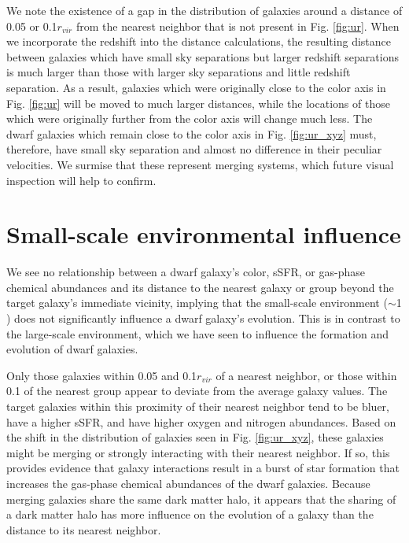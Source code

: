 We note the existence of a gap in the distribution of galaxies around a distance 
of 0.05 \hMpc or 0.1$r_{vir}$ from the nearest neighbor that is not present in 
Fig. \ref{fig:ur}.  When we incorporate the redshift into the distance 
calculations, the resulting distance between galaxies which have small sky 
separations but larger redshift separations is much larger than those with 
larger sky separations and little redshift separation.  As a result, galaxies 
which were originally close to the color axis in Fig. \ref{fig:ur} will be 
moved to much larger distances, while the locations of those which were 
originally further from the color axis will change much less.  The dwarf 
galaxies which remain close to the color axis in Fig. \ref{fig:ur_xyz} must, 
therefore, have small sky separation and almost no difference in their peculiar 
velocities.  We surmise that these represent merging systems, which future 
visual inspection will help to confirm.




\section[Environmental influence]{Small-scale environmental influence}

We see no relationship between a dwarf galaxy's color, sSFR, or gas-phase 
chemical abundances and its distance to the nearest galaxy or group beyond the 
target galaxy's immediate vicinity, implying that the small-scale environment 
($\sim$1 \hMpc) does not significantly influence a dwarf galaxy's evolution.  
This is in contrast to the large-scale environment, which we have seen to 
influence the formation and evolution of dwarf galaxies.

Only those galaxies within 0.05 \hMpc and 0.1$r_{vir}$ of a nearest neighbor, or 
those within 0.1 \hMpc of the nearest group appear to deviate from the average 
galaxy values.  The target galaxies within this proximity of their nearest 
neighbor tend to be bluer, have a higher sSFR, and have higher oxygen and 
nitrogen abundances.  Based on the shift in the distribution of galaxies seen in 
Fig. \ref{fig:ur_xyz}, these galaxies might be merging or strongly interacting 
with their nearest neighbor.  If so, this provides evidence that galaxy 
interactions result in a burst of star formation that increases the gas-phase 
chemical abundances of the dwarf galaxies.  Because merging galaxies share the 
same dark matter halo, it appears that the sharing of a dark matter halo has 
more influence on the evolution of a galaxy than the distance to its nearest 
neighbor.

